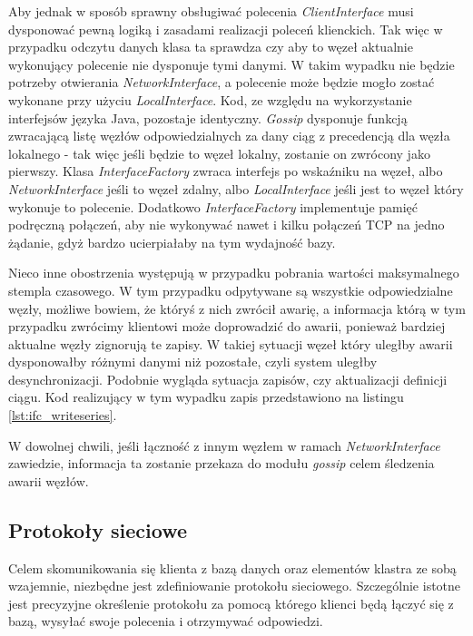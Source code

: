 \documentclass[a4paper,polish,12pt,twoside]{article}
\newcommand{\WorkLineSpread}{1.5}
\begin{document}
Aby jednak w sposób sprawny obsługiwać polecenia \textit{ClientInterface} musi dysponować pewną logiką i zasadami realizacji poleceń klienckich. Tak więc w przypadku odczytu danych klasa ta sprawdza czy aby to węzeł aktualnie wykonujący polecenie nie dysponuje tymi danymi. W takim wypadku nie będzie potrzeby otwierania \textit{NetworkInterface}, a polecenie może będzie mogło zostać wykonane przy użyciu \textit{LocalInterface}. Kod, ze względu na wykorzystanie interfejsów języka Java, pozostaje identyczny. \textit{Gossip} dysponuje funkcją zwracającą listę węzłów odpowiedzialnych za dany ciąg z precedencją dla węzła lokalnego - tak więc jeśli będzie to węzeł lokalny, zostanie on zwrócony jako pierwszy. Klasa \textit{InterfaceFactory} zwraca interfejs po wskaźniku na węzeł, albo \textit{NetworkInterface} jeśli to węzeł zdalny, albo \textit{LocalInterface} jeśli jest to węzeł który wykonuje to polecenie. Dodatkowo \textit{InterfaceFactory} implementuje pamięć podręczną połączeń, aby nie wykonywać nawet i kilku połączeń TCP na jedno żądanie, gdyż bardzo ucierpiałaby na tym wydajność bazy.

Nieco inne obostrzenia występują w przypadku pobrania wartości maksymalnego stempla czasowego. W tym przypadku odpytywane są wszystkie odpowiedzialne węzły, możliwe bowiem, że któryś z nich zwrócił awarię, a informacja którą w tym przypadku zwrócimy klientowi może doprowadzić do awarii, ponieważ bardziej aktualne węzły zignorują te zapisy. W takiej sytuacji węzeł który uległby awarii dysponowałby różnymi danymi niż pozostałe, czyli system uległby desynchronizacji. Podobnie wygląda sytuacja zapisów, czy aktualizacji definicji ciągu. Kod realizujący w tym wypadku zapis przedstawiono na listingu \ref{lst:ifc_writeseries}.

\begin{listing}
\linespread{1} \small  \linespread{\WorkLineSpread} \normalsize
\end{listing}

W dowolnej chwili, jeśli łączność z innym węzłem w ramach \textit{NetworkInterface} zawiedzie, informacja ta zostanie przekaza do modułu \textit{gossip} celem śledzenia awarii węzłów.

	\subsection{Protokoły sieciowe}
Celem skomunikowania się klienta z bazą danych oraz elementów klastra ze sobą wzajemnie, niezbędne jest zdefiniowanie protokołu sieciowego. Szczególnie istotne jest precyzyjne określenie protokołu za pomocą którego klienci będą łączyć się z bazą, wysyłać swoje polecenia i otrzymywać odpowiedzi.
\end{document}
